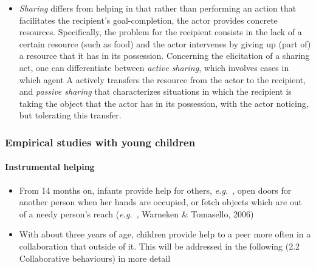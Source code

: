 \documentclass{article}
\newcommand{\eg}{{\textit{e.g.~}}}
\begin{document}
\begin{itemize}
\item \textit{Sharing} differs from helping in that rather than performing an
action that facilitates the recipient's goal-completion, the actor provides
concrete resources. Specifically, the problem for the recipient consists in the
lack of a certain resource (such as food) and the actor intervenes by giving up
(part of) a resource that it has in its possession. Concerning the
elicitation of a sharing act, one can differentiate between \emph{active
sharing}, which involves cases in which agent A actively transfers the resource
from the actor to the recipient, and \emph{passive sharing} that characterizes
situations in which the recipient is taking the object that the actor has in
its possession, with the actor noticing, but tolerating this transfer. 

\end{itemize}


\subsubsection{Empirical studies with young children}


\paragraph{Instrumental helping}

\begin{itemize}

\item From 14 months on, infants provide help for others, \eg, open doors for
another person when her hands are occupied, or fetch objects which are out of a
needy person's reach (\eg, Warneken \& Tomasello, 2006)

\item With about three years of age, children provide help to a peer more often
in a collaboration that outside of it.  This will be addressed in the following
(2.2 Collaborative behaviours) in more detail

\end{itemize}
\end{document}
